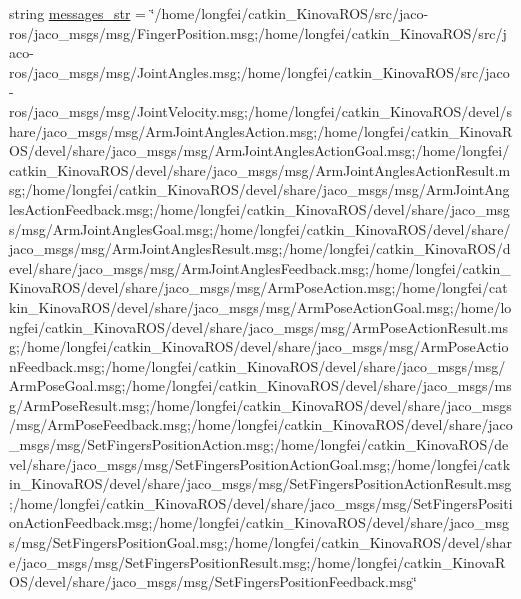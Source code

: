 \begin{DoxyCompactItemize}
string \hyperlink{namespacejaco__msgs-genmsg-context_ad0c0ed6261db181e8c56cce39be2eec2}{messages\+\_\+str} = \char`\"{}/home/longfei/catkin\+\_\+\+Kinova\+R\+OS/src/jaco-\/ros/jaco\+\_\+msgs/msg/Finger\+Position.\+msg;/home/longfei/catkin\+\_\+\+Kinova\+R\+OS/src/jaco-\/ros/jaco\+\_\+msgs/msg/Joint\+Angles.\+msg;/home/longfei/catkin\+\_\+\+Kinova\+R\+OS/src/jaco-\/ros/jaco\+\_\+msgs/msg/Joint\+Velocity.\+msg;/home/longfei/catkin\+\_\+\+Kinova\+R\+OS/devel/share/jaco\+\_\+msgs/msg/Arm\+Joint\+Angles\+Action.\+msg;/home/longfei/catkin\+\_\+\+Kinova\+R\+OS/devel/share/jaco\+\_\+msgs/msg/Arm\+Joint\+Angles\+Action\+Goal.\+msg;/home/longfei/catkin\+\_\+\+Kinova\+R\+OS/devel/share/jaco\+\_\+msgs/msg/Arm\+Joint\+Angles\+Action\+Result.\+msg;/home/longfei/catkin\+\_\+\+Kinova\+R\+OS/devel/share/jaco\+\_\+msgs/msg/Arm\+Joint\+Angles\+Action\+Feedback.\+msg;/home/longfei/catkin\+\_\+\+Kinova\+R\+OS/devel/share/jaco\+\_\+msgs/msg/Arm\+Joint\+Angles\+Goal.\+msg;/home/longfei/catkin\+\_\+\+Kinova\+R\+OS/devel/share/jaco\+\_\+msgs/msg/Arm\+Joint\+Angles\+Result.\+msg;/home/longfei/catkin\+\_\+\+Kinova\+R\+OS/devel/share/jaco\+\_\+msgs/msg/Arm\+Joint\+Angles\+Feedback.\+msg;/home/longfei/catkin\+\_\+\+Kinova\+R\+OS/devel/share/jaco\+\_\+msgs/msg/Arm\+Pose\+Action.\+msg;/home/longfei/catkin\+\_\+\+Kinova\+R\+OS/devel/share/jaco\+\_\+msgs/msg/Arm\+Pose\+Action\+Goal.\+msg;/home/longfei/catkin\+\_\+\+Kinova\+R\+OS/devel/share/jaco\+\_\+msgs/msg/Arm\+Pose\+Action\+Result.\+msg;/home/longfei/catkin\+\_\+\+Kinova\+R\+OS/devel/share/jaco\+\_\+msgs/msg/Arm\+Pose\+Action\+Feedback.\+msg;/home/longfei/catkin\+\_\+\+Kinova\+R\+OS/devel/share/jaco\+\_\+msgs/msg/Arm\+Pose\+Goal.\+msg;/home/longfei/catkin\+\_\+\+Kinova\+R\+OS/devel/share/jaco\+\_\+msgs/msg/Arm\+Pose\+Result.\+msg;/home/longfei/catkin\+\_\+\+Kinova\+R\+OS/devel/share/jaco\+\_\+msgs/msg/Arm\+Pose\+Feedback.\+msg;/home/longfei/catkin\+\_\+\+Kinova\+R\+OS/devel/share/jaco\+\_\+msgs/msg/Set\+Fingers\+Position\+Action.\+msg;/home/longfei/catkin\+\_\+\+Kinova\+R\+OS/devel/share/jaco\+\_\+msgs/msg/Set\+Fingers\+Position\+Action\+Goal.\+msg;/home/longfei/catkin\+\_\+\+Kinova\+R\+OS/devel/share/jaco\+\_\+msgs/msg/Set\+Fingers\+Position\+Action\+Result.\+msg;/home/longfei/catkin\+\_\+\+Kinova\+R\+OS/devel/share/jaco\+\_\+msgs/msg/Set\+Fingers\+Position\+Action\+Feedback.\+msg;/home/longfei/catkin\+\_\+\+Kinova\+R\+OS/devel/share/jaco\+\_\+msgs/msg/Set\+Fingers\+Position\+Goal.\+msg;/home/longfei/catkin\+\_\+\+Kinova\+R\+OS/devel/share/jaco\+\_\+msgs/msg/Set\+Fingers\+Position\+Result.\+msg;/home/longfei/catkin\+\_\+\+Kinova\+R\+OS/devel/share/jaco\+\_\+msgs/msg/Set\+Fingers\+Position\+Feedback.\+msg\char`\"{}

\end{DoxyCompactItemize}
